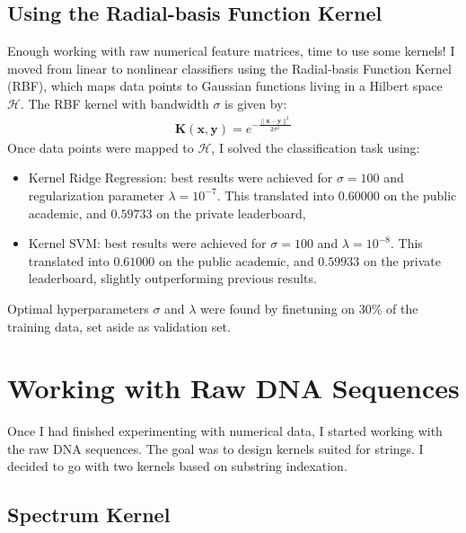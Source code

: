 \documentclass[final]{cvpr}
\begin{document}
	\subsection{Using the Radial-basis Function Kernel}
	
	Enough working with raw numerical feature matrices, time to use some kernels! I moved from linear to nonlinear classifiers using the Radial-basis Function Kernel (RBF), which maps data points to Gaussian functions living in a Hilbert space $\mathcal{H}$. The RBF kernel with bandwidth $\sigma$ is given by:
	\vspace{-0.2mm}
	\begin{equation*}
		\begin{aligned}
			\mathbf{K}(\mathbf{x}, \mathbf{y})=e^{-\frac{\|\mathbf{x}-\mathbf{y}\|^{2}}{2 \sigma^{2}}}
		\end{aligned}
	\end{equation*}
	\noindent
	Once data points were mapped to $\mathcal{H}$, I solved the classification task using: 
	
	\begin{itemize}
		\item Kernel Ridge Regression: best results were achieved for $\sigma = 100$ and regularization parameter $\lambda = 10^{-7}$. This translated into $0.60000$ on the public academic, and $0.59733$ on the private leaderboard,
		\item Kernel SVM: best results were achieved for $\sigma = 100$ and $\lambda = 10^{-8}$. This translated into $0.61000$ on the public academic, and $0.59933$ on the private leaderboard, slightly outperforming previous results.
	\end{itemize} 
	\noindent
	Optimal hyperparameters $\sigma$ and $\lambda$ were found by finetuning on $30\%$ of the training data, set aside as validation set.
	
	\section{Working with Raw DNA Sequences}
	
	Once I had finished experimenting with numerical data, I started working with the raw DNA sequences. The goal was to design kernels suited for strings. I decided to go with two kernels based on substring indexation.
	
	\subsection{Spectrum Kernel}
	
\end{document}
